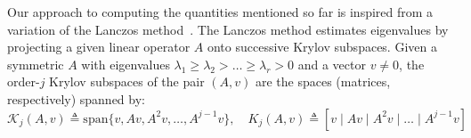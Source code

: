 \documentclass[10pt]{article}
\numberwithin{equation}{section}
\newcommand{\+}{%
	\raisebox{0.18ex}{\scaleobj{0.55}{+}}
}
\theoremstyle{definition}
\theoremstyle{definition}
\begin{document}


Our approach to computing the quantities mentioned so far is inspired from a variation of the Lanczos method~\cite{lanczos1950iteration}. The Lanczos method estimates eigenvalues by projecting a given linear operator $A$ onto successive Krylov subspaces. 
Given a symmetric $A$ with eigenvalues $\lambda_1 \geq \lambda_2 > \dots \geq \lambda_r > 0$ and a vector $v \neq 0$, the order-$j$ Krylov subspaces of the pair $(A, v)$ are the spaces (matrices, respectively) spanned by: 
\begin{equation}
	\mathcal{K}_j(A, v) \triangleq \mathrm{span}\{ v, Av, A^2 v, \dots, A^{j-1}v \}, \quad K_j(A, v) \triangleq [ v \mid Av \mid A^2 v \mid \dots \mid A^{j-1}v]
\end{equation}
\end{document}
